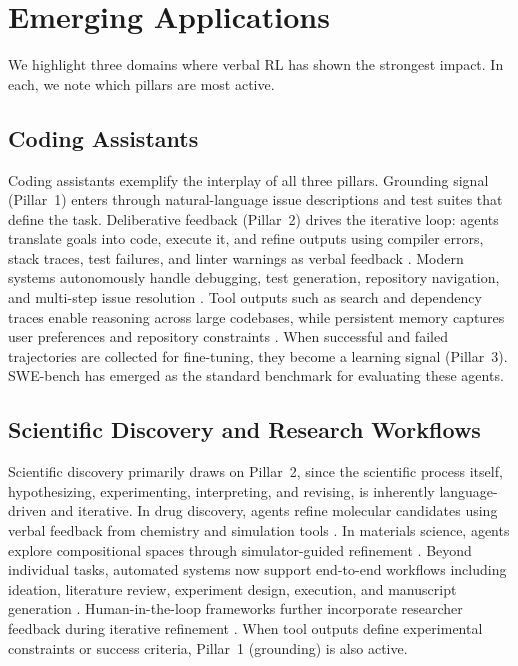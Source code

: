 \section{Emerging Applications}
\label{app:applications}
 
We highlight three domains where verbal RL has shown the strongest impact. In each, we note which pillars are most active.
 
\subsection{Coding Assistants}
 
Coding assistants exemplify the interplay of all three pillars. Grounding signal (Pillar~1) enters through natural-language issue descriptions and test suites that define the task. Deliberative feedback (Pillar~2) drives the iterative loop: agents translate goals into code, execute it, and refine outputs using compiler errors, stack traces, test failures, and linter warnings as verbal feedback \citep{yang2024swe, chen2024teaching}. Modern systems autonomously handle debugging, test generation, repository navigation, and multi-step issue resolution \citep{yang2023intercode}. Tool outputs such as search and dependency traces enable reasoning across large codebases, while persistent memory captures user preferences and repository constraints \citep{wang2023voyager}. When successful and failed trajectories are collected for fine-tuning, they become a learning signal (Pillar~3). SWE-bench \citep{jimenez2024swebenchlanguagemodelsresolve} has emerged as the standard benchmark for evaluating these agents.
 
\subsection{Scientific Discovery and Research Workflows}
 
Scientific discovery primarily draws on Pillar~2, since the scientific process itself, hypothesizing, experimenting, interpreting, and revising, is inherently language-driven and iterative. In drug discovery, agents refine molecular candidates using verbal feedback from chemistry and simulation tools \citep{m2024augmenting}. In materials science, agents explore compositional spaces through simulator-guided refinement \citep{szymanski2023autonomous}. Beyond individual tasks, automated systems now support end-to-end workflows including ideation, literature review, experiment design, execution, and manuscript generation \citep{lu2024ai}. Human-in-the-loop frameworks further incorporate researcher feedback during iterative refinement \citep{schmidgall2025agent}. When tool outputs define experimental constraints or success criteria, Pillar~1 (grounding) is also active.
 
